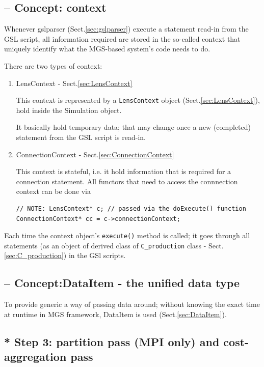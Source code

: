 \subsection{-- Concept: context}
\label{sec:context-MGS}
\label{sec:MGS-context}

Whenever gslparser (Sect.\ref{sec:gslparser}) execute a statement read-in from
the GSL script, all information required are stored in the so-called context
that uniquely identify what the MGS-based system's code needs to do.

There are two types of context:
\begin{enumerate}
  \item LensContext - Sect.\ref{sec:LensContext}

This context is represented by a \verb!LensContext!
object (Sect.\ref{sec:LensContext}), hold inside the Simulation object.

It basically hold temporary data; that may change once a new
(completed) statement from the GSL script is read-in.
  
  \item ConnectionContext - Sect.\ref{sec:ConnectionContext}

This context is stateful, i.e. it hold information that is required for a
connection statement. All functors that need to access the connnection context
can be done via 
\begin{verbatim}
// NOTE: LensContext* c; // passed via the doExecute() function
ConnectionContext* cc = c->connectionContext;
\end{verbatim}

\end{enumerate}

Each time the context object's \verb!execute()! method is called; it goes
through all statements (as an object of derived class of \verb!C_production!
class - Sect.\ref{sec:C_production}) in the GSl scripts.

\subsection{-- Concept:DataItem - the unified data type}

To provide generic a way of passing data around; without knowing the exact time
at runtime in MGS framework, DataItem is used (Sect.\ref{sec:DataItem}).

\subsection{* Step 3: partition pass (MPI only) and cost-aggregation pass}
\label{sec:GSL-pass-partition}
\label{sec:GSL-pass-cost-aggregation}

